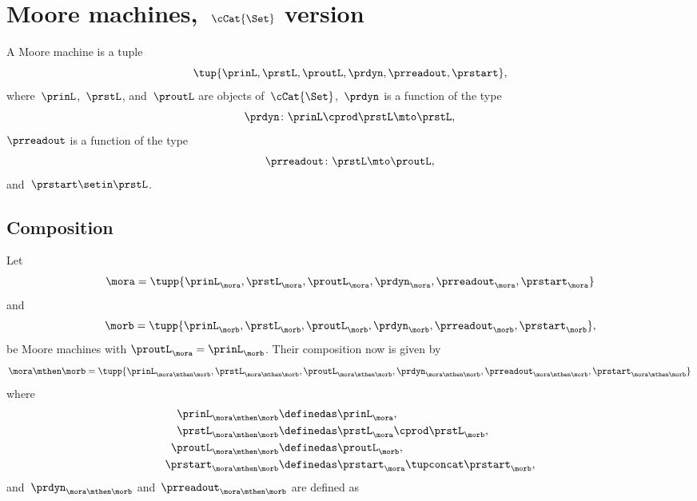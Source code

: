 
\section{Moore machines,~$\cCat{\Set}$ version}

\begin{definition}
    \label{def:moore_machine_3rd}
    A Moore machine is a tuple
    \begin{equation}
        \label{eq:moore-tuple-improved-again}
        \tup{\prinL,\prstL,\proutL,\prdyn,\prreadout,\prstart},
    \end{equation}
    where~$\prinL$,~$\prstL$, and~$\proutL$ are objects of~$\cCat{\Set}$,~$\prdyn$ is a function of the type
    \begin{equation*}
        \prdyn \colon \prinL \cprod \prstL \mto \prstL,
    \end{equation*}
    $\prreadout$ is a function of the type
    \begin{equation*}
        \prreadout \colon \prstL \mto \proutL,
    \end{equation*}
    and~$\prstart \setin \prstL$.
\end{definition}

\subsection{Composition}
\label{sec:composition-of-Moore-machines}

Let
\begin{equation}
    \label{eq:moore-mora-3rd}
    \mora = \tupp{\prinL_{\mora},\prstL_{\mora},\proutL_{\mora},\prdyn_{\mora},\prreadout_{\mora},\prstart_{\mora}}
\end{equation}
%
and
%
\begin{equation}
    \label{eq:moore-morb-3rd}
    \morb = \tupp{\prinL_{\morb},\prstL_{\morb},\proutL_{\morb},\prdyn_{\morb},\prreadout_{\morb},\prstart_{\morb}},
\end{equation}
be Moore machines with $\proutL_{\mora} = \prinL_{\morb}$.
Their composition now is given by
\begin{equation*}
    \mora \mthen \morb = \tupp{\prinL_{\mora \mthen \morb},\prstL_{\mora \mthen \morb},\proutL_{\mora \mthen \morb},\prdyn_{\mora \mthen \morb},\prreadout_{\mora \mthen \morb},\prstart_{\mora \mthen \morb}}
\end{equation*}
where
%
\begin{equation}
    \label{eq:moore-comp-3rd-1}
    \begin{aligned}
        \prinL_{\mora\mthen\morb}   & \definedas \prinL_{\mora}, \\
        \prstL_{\mora\mthen\morb}   & \definedas \prstL_{\mora} \cprod  \prstL_{\morb}, \\
        \proutL_{\mora\mthen\morb}  & \definedas \proutL_{\morb}, \\
        \prstart_{\mora\mthen\morb} & \definedas \prstart_{\mora} \tupconcat \prstart_{\morb},
    \end{aligned}
\end{equation}
and~$\prdyn_{\mora \mthen \morb}$ and~$\prreadout_{\mora \mthen \morb}$ are defined as

